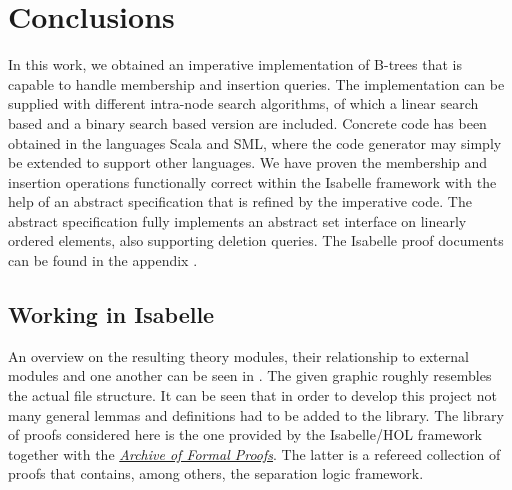 

\chapter{Conclusions}\label{chapter:conclusion}

In this work, we obtained an imperative implementation
of B-trees that is capable to handle membership and insertion queries.
The implementation can be supplied with different
intra-node search algorithms, of which a linear search based
and a binary search based version are included.
Concrete code has been obtained in the languages Scala and SML,
where the code generator may simply be extended to support other languages.
We have proven the membership and insertion operations
functionally correct within the Isabelle framework
with the help of an abstract specification
that is refined by the imperative code.
The abstract specification fully implements
an abstract set interface on linearly ordered elements,
also supporting deletion queries.
The Isabelle proof documents can be found
in the appendix \parencite{MuendlerAppendix21}.

\section{Working in Isabelle}

An overview on the resulting theory modules,
their relationship to external modules and one another
can be seen in .
The given graphic roughly resembles the actual file structure.
It can be seen that in order to develop this project
not many general lemmas and definitions had to be added to the library.
The library of proofs considered here
is the one provided by the Isabelle/HOL framework together with the \href{https://www.isa-afp.org}{\textit{Archive of Formal Proofs}}.
The latter is a refereed collection of proofs that contains, among others,
the separation logic framework.

